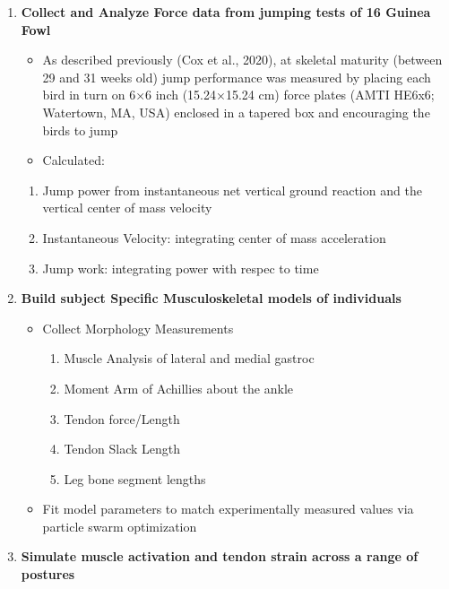 \documentclass[
]{article}
\providecommand{\tightlist}{%
  \setlength{\itemsep}{0pt}\setlength{\parskip}{0pt}}
\begin{document}
\begin{enumerate}
\def\labelenumi{\arabic{enumi}.}
\item
  \textbf{Collect and Analyze Force data from jumping tests of 16 Guinea
  Fowl}

  \begin{itemize}
  \tightlist
  \item
    As described previously (Cox et al., 2020), at skeletal maturity
    (between 29 and 31 weeks old) jump performance was measured by
    placing each bird in turn on 6×6 inch (15.24×15.24 cm) force plates
    (AMTI HE6x6; Watertown, MA, USA) enclosed in a tapered box and
    encouraging the birds to jump
  \item
    Calculated:
  \end{itemize}

  \begin{enumerate}
  \def\labelenumii{\arabic{enumii}.}
  \tightlist
  \item
    Jump power from instantaneous net vertical ground reaction and the
    vertical center of mass velocity
  \item
    Instantaneous Velocity: integrating center of mass acceleration
  \item
    Jump work: integrating power with respec to time
  \end{enumerate}
\item
  \textbf{Build subject Specific Musculoskeletal models of individuals}

  \begin{itemize}
  \item
    Collect Morphology Measurements

    \begin{enumerate}
    \def\labelenumii{\arabic{enumii}.}
    \tightlist
    \item
      Muscle Analysis of lateral and medial gastroc
    \item
      Moment Arm of Achillies about the ankle
    \item
      Tendon force/Length
    \item
      Tendon Slack Length
    \item
      Leg bone segment lengths
    \end{enumerate}
  \item
    Fit model parameters to match experimentally measured values via
    particle swarm optimization
  \end{itemize}
\item
  \textbf{Simulate muscle activation and tendon strain across a range of
  postures}


\end{enumerate}
\end{document}
